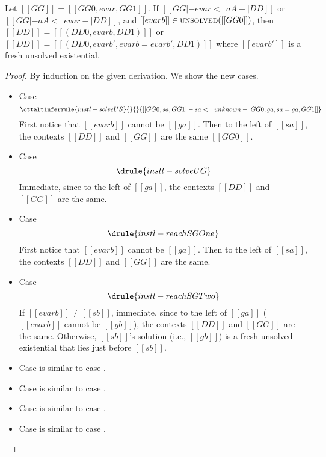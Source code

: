 \begin{lemma}
  Let $[[GG]] = [[  GG0, evar, GG1 ]]$. If  $[[ GG |- evar <~~ aA -| DD    ]]$ or $[[  GG |- aA <~~ evar -| DD  ]]$, and $[[evarb]] \in \textsc{unsolved}([[GG0]])$,
  then  $[[DD]] = [[(DD0, evarb, DD1)]]$ or $[[DD]] = [[(DD0, evarb', evarb = evarb', DD1)]]$ where $[[evarb']]$ is a fresh unsolved existential.
\end{lemma}
\begin{proof}
  By induction on the given derivation. We show the new cases.

  \begin{itemize}
  \item Case \[     \ottaltinferrule{instl-solveUS}{}{  }{ [[  GG0, sa, GG1 |- sa <~~ unknown -| GG0 , ga, sa = ga, GG1 ]] }  \]
    First notice that $[[evarb]]$ cannot be $[[ga]]$. Then to the left of $[[sa]]$, the contexts $[[DD]]$ and $[[GG]]$ are the same $[[GG0]]$.
  \item Case \[  \drule{instl-solveUG}   \]
    Immediate, since to the left of $[[ga]]$, the contexts $[[DD]]$ and $[[GG]]$ are the same.
  \item Case \[  \drule{instl-reachSGOne}    \]
    First notice that $[[evarb]]$ cannot be $[[ga]]$. Then to the left of $[[sa]]$, the contexts $[[DD]]$ and $[[GG]]$ are the same.
  \item Case \[  \drule{instl-reachSGTwo}    \]
    If $[[evarb]] \neq [[sb]] $, immediate, since to the left of $[[ga]]$ ($[[evarb]]$ cannot be $[[gb]]$), the contexts $[[DD]]$ and $[[GG]]$ are the same.
    Otherwise, $[[sb]]$'s solution (i.e., $[[gb]]$) is a fresh unsolved existential that lies just before $[[sb]]$.
  \item Case  is similar to case .
  \item Case  is similar to case .
  \item Case  is similar to case .
  \item Case  is similar to case .
  \end{itemize}

\end{proof}


